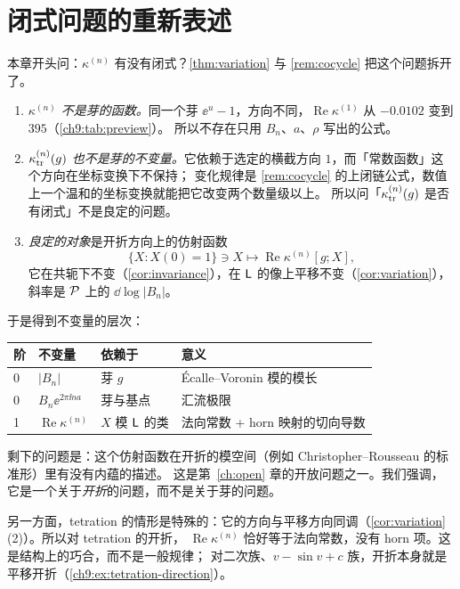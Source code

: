 \section{闭式问题的重新表述}\label{ch9:sec:closed-form}

本章开头问：$\kappa^{(n)}$ 有没有闭式？\cref{thm:variation} 与 \cref{rem:cocycle} 把这个问题拆开了。

\begin{enumerate}
\item \emph{$\kappa^{(n)}$ 不是芽的函数。}同一个芽 $\ee^u-1$，方向不同，$\operatorname{Re}\kappa^{(1)}$ 从 $-0.0102$ 变到 $395$（\cref{ch9:tab:preview}）。
  所以不存在只用 $B_n$、$a$、$\rho$ 写出的公式。
\item \emph{$\kappa_{\mathrm{tr}}^{(n)}(g)$ 也不是芽的不变量。}它依赖于选定的横截方向 $1$，而「常数函数」这个方向在坐标变换下不保持；
  变化规律是 \cref{rem:cocycle} 的上闭链公式，数值上一个温和的坐标变换就能把它改变两个数量级以上。
  所以问「$\kappa_{\mathrm{tr}}^{(n)}(g)$ 是否有闭式」不是良定的问题。
\item \emph{良定的对象}是开折方向上的仿射函数
  \[
   \{X:X(0)=1\}\ni X\longmapsto\operatorname{Re}\kappa^{(n)}[g;X],
  \]
  它在共轭下不变（\cref{cor:invariance}），在 $\mathsf L$ 的像上平移不变（\cref{cor:variation}），斜率是 $\mathcal P$ 上的 $\dd\log|B_n|$。
\end{enumerate}

于是得到不变量的层次：
\begin{center}\small
\begin{tabular}{llll}
\toprule
阶 & 不变量 & 依赖于 & 意义\\
\midrule
0 & $|B_n|$ & 芽 $g$ & \'Ecalle--Voronin 模的模长\\
0 & $B_n\ee^{2\pi\ii na}$ & 芽与基点 & 汇流极限\\
1 & $\operatorname{Re}\kappa^{(n)}$ & $X$ 模 $\mathsf L$ 的类 & 法向常数 + horn 映射的切向导数\\
\bottomrule
\end{tabular}
\end{center}
剩下的问题是：这个仿射函数在开折的模空间（例如 Christopher--Rousseau 的标准形\cite{ChristopherRousseau}）里有没有内蕴的描述。
这是第~\ref{ch:open} 章的开放问题之一。我们强调，它是一个关于\emph{开折}的问题，而不是关于芽的问题。

另一方面，tetration 的情形是特殊的：它的方向与平移方向同调（\cref{cor:variation}(2)）。所以对 tetration 的开折，
$\operatorname{Re}\kappa^{(n)}$ 恰好等于法向常数，没有 horn 项。这是结构上的巧合，而不是一般规律；
对二次族、$v-\sin v+c$ 族，开折本身就是平移开折（\cref{ch9:ex:tetration-direction}）。

